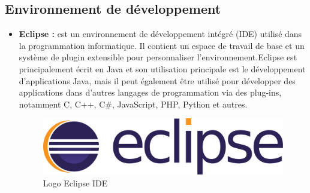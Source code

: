 \subsection[Environnement de développement]{Environnement de développement}
\begin{itemize}
	\item \textbf{Eclipse\cite{eclipse} :} est un environnement de développement intégré (IDE) utilisé dans la programmation informatique. Il contient un espace de travail de base et un système de plugin extensible pour personnaliser l'environnement.Eclipse est principalement écrit en Java et son utilisation principale est le développement d'applications Java, mais il peut également être utilisé pour développer des applications dans d'autres langages de programmation via des plug-ins, notamment C, C++, C\#, JavaScript, PHP, Python et autres.
	\begin{figure}[H]
		\centering
		\includegraphics[width=0.3\linewidth]{img/logos/eclipse}
		\caption[Logo Eclipse IDE]{Logo Eclipse IDE}
		\label{fig:eclipse}
	\end{figure}


\end{itemize}
